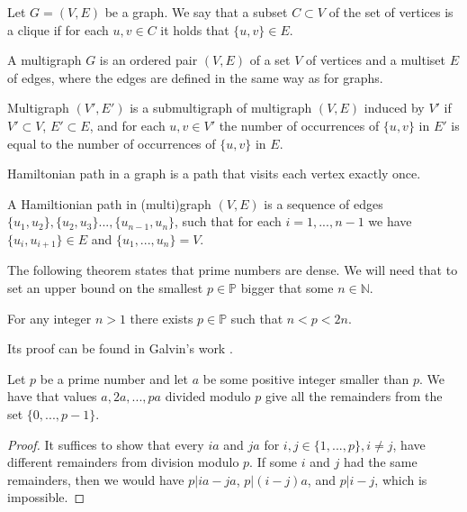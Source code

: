 \begin{defn}[clique]
Let $G=(V,E)$ be a graph.
We say that a subset $C \subset V$ of the set of vertices is a clique if
for each $u,v \in C$ it holds that $\{u,v\} \in E$.
\end{defn}

\begin{defn}[multigraph]
A multigraph $G$ is an ordered pair $(V,E)$ of a set $V$ of vertices and a multiset $E$ of edges,
where the edges are defined in the same way as for graphs.
\end{defn}

\begin{defn}
Multigraph $(V', E')$ is a submultigraph of multigraph $(V,E)$ induced by $V'$
if $V' \subset V$, $E' \subset E$, and for each $u,v \in V'$ 
the number of occurrences of $\{u,v\}$ in $E'$ is equal to the number of occurrences of $\{u,v\}$ in $E$.
\end{defn}

Hamiltonian path in a graph is a path that visits each vertex exactly once.

\begin{defn}
A Hamiltionian path in (multi)graph $(V,E)$
is a sequence of edges $\{u_1, u_2\}, \{u_2, u_3\} ..., \{u_{n-1}, u_n\}$,
such that for each $i=1,...,n-1$ we have $\{u_i, u_{i+1}\} \in E$
and $\{u_1, ..., u_n\} = V$.
\end{defn}


The following theorem states that prime numbers are dense.
We will need that to set an upper bound on the smallest $p \in \mathbb{P}$
bigger that some $n \in \mathbb{N}$.

\begin{thm} \label{bertrand-chebyshev}
For any integer $n>1$ there exists $p \in \mathbb{P}$ such that $n < p < 2n$.
\end{thm}

Its proof can be found in Galvin's work \cite{bertrand}.

\begin{thm} \label{zp}
Let $p$ be a prime number and let $a$ be some positive integer smaller than $p$.
We have that values $a, 2a, ..., pa$ divided modulo $p$ give all the remainders from the set $\{0, ..., p-1\}$.
\end{thm}

\begin{proof}
It suffices to show that every $ia$ and $ja$ for $i,j \in \{1, ..., p\}, i \neq j$,
have different remainders from division modulo $p$.
If some $i$ and $j$ had the same remainders,
then we would have $p | ia - ja$, $p | (i-j)a$, and $p | i-j$, which is impossible.
\end{proof}

